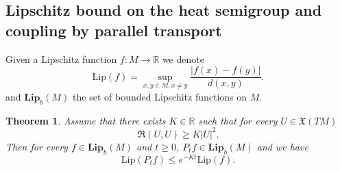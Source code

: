 \documentclass[11pt]{article}
\numberwithin{equation}{section}
\newtheorem{theorem}{Theorem}[section]
\begin{document}
  \subsection{Lipschitz bound on the heat semigroup and coupling by parallel transport}
  
  Given  a Lipschitz function $f : M \to \mathbb{R}$ we denote
  \[
  \mathrm{Lip} (f)=\sup_{x,y \in M, x \neq y}  \frac{|f(x)-f(y)|}{d(x,y)}.
  \]
  and $\mathbf{Lip}_b (M)$ the set of bounded Lipschitz functions on $M$.
\begin{theorem}
 Assume that there exists $K \in \mathbb{R}$ such that for every $U \in \mathfrak{X}(TM)$
\[
\mathfrak{R}(U,U) \ge K |U|^2.
\] 
Then for every $f \in \mathbf{Lip}_b (M)$ and $t \ge 0$, $P_tf \in \mathbf{Lip}_b (M)$ and we have
\[
\mathrm{Lip} (P_t f)\le e^{-Kt} \mathrm{Lip} ( f).
\] 
\end{theorem}
\end{document}
